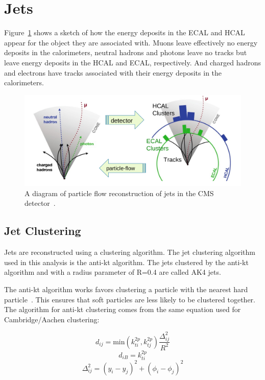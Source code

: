\section{Jets}

Figure~\ref{fig:pflow_jets} shows a sketch of how the energy deposits in the ECAL and HCAL appear for the object they are associated with. Muons leave effectively no energy deposits in the calorimeters, neutral hadrons and photons leave no tracks but leave energy deposits in the HCAL and ECAL, respectively. And charged hadrons and electrons have tracks associated with their energy deposits in the calorimeters.


\begin{figure}[h]
\centering
\includegraphics[width=1.0\textwidth]{figures/particle_flow_pandolfi}
\caption{A diagram of particle flow reconstruction of jets in the CMS detector~\cite{pflow_pandolfi}.}
\label{fig:pflow_jets}
\end{figure}



\subsection*{Jet Clustering}


Jets are reconstructed using a clustering algorithm. The jet clustering algorithm used in this analysis is the anti-kt algorithm. The jets clustered by the anti-kt algorithm and with a radius parameter of R=0.4 are called AK4 jets.

The anti-kt algorithm works favors clustering a particle with the nearest hard particle~\cite{anti-kt}. This ensures that soft particles are less likely to be clustered together. The algorithm for anti-kt clustering comes from the same equation used for Cambridge/Aachen clustering:

\begin{equation}
	d_{ij} = \text{min} \left( k^{2p}_{ti}, k^{2p}_{tj} \right) \frac{\Delta^2_{ij}}{R^2}
\end{equation}
\begin{equation}
	d_{iB} = k^{2p}_{ti}
\end{equation}
\begin{equation}
	\Delta_{ij}^2 = (y_i - y_j)^2 + (\phi_i - \phi_j)^2
\end{equation}

